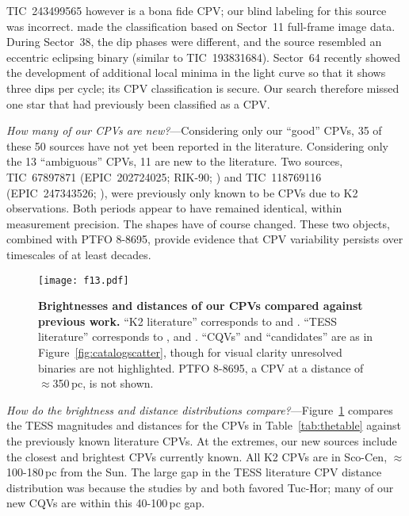\documentclass[11pt,twocolumn,tighten]{aastex63}
\begin{document}
TIC~243499565 however is a bona fide CPV; our blind labeling for this
source was incorrect.  \citet{2021AJ....161...60S} made the
classification based on Sector~11 full-frame image data.  During
Sector~38, the dip phases were different, and the source
resembled an eccentric eclipsing binary (similar to TIC~193831684).  Sector~64 recently showed
the development of additional local minima in the light curve so that
it shows three dips per cycle; its CPV classification is secure.  Our
search therefore missed one star that had previously been classified
as a CPV.

{\it How many of our CPVs are new?}---Considering only our ``good''
CPVs, 35 of these 50 sources have not yet been reported in the
literature.  Considering only the 13 ``ambiguous'' CPVs, 11 are new to
the literature.  Two sources, TIC~67897871 (EPIC~202724025; RIK-90;
\citealt{2017AJ....153..152S}) and TIC~118769116 (EPIC~247343526;
\citealt{2017AJ....153..152S}), were previously only known to be CPVs
due to K2 observations.  Both periods appear to have remained
identical, within measurement precision.  The shapes have of course changed.
These two objects, combined with PTFO 8-8695, provide evidence
that CPV variability persists over timescales of at least decades.


\begin{figure}[!t]
	\begin{center}
		\centering
		\texttt{[image: f13.pdf]}
		\vspace{-0.2cm}
		\caption{
			{\bf Brightnesses and distances of our CPVs compared
      against previous work.}  
      ``K2 literature'' corresponds to \citet{2017AJ....153..152S} and
      \citet{2018AJ....155...63S}.  ``TESS literature'' corresponds to
      \citet{2019ApJ...876..127Z,2021AJ....161...60S,2022AJ....163..144G}, and \citet{2023ApJ...945..114P}.
      ``CQVs'' and ``candidates'' are as in
      Figure~\ref{fig:catalogscatter}, though for visual clarity
      unresolved binaries are not highlighted.  PTFO 8-8695, a CPV at
      a distance of $\approx$350\,pc, is not shown.
		}
			\vspace{-0.5cm}
		\label{fig:tmagvsdist}
	\end{center}
\end{figure}



{\it How do the brightness and distance distributions
compare?}---Figure~\ref{fig:tmagvsdist} compares the TESS magnitudes
and distances for the CPVs in Table~\ref{tab:thetable} against the
previously known literature CPVs.  At the extremes, our new sources
include the closest and brightest CPVs currently known. 
All K2 CPVs are in Sco-Cen,
$\approx$100-180\,pc from the Sun.  The large gap in the TESS literature CPV
distance distribution was because the studies by
\citep{2019ApJ...876..127Z} and \citet{2023ApJ...945..114P} both
favored Tuc-Hor; many of our new CQVs are within this 40-100\,pc gap.
\end{document}

